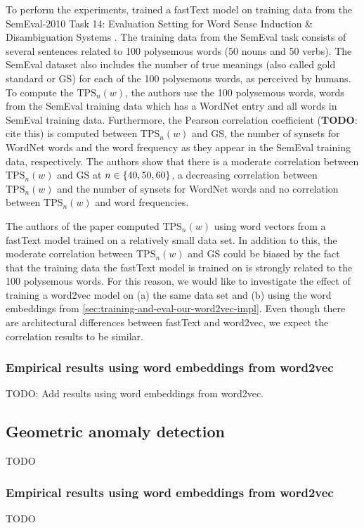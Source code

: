 To perform the experiments, \cite{jakubowski2020topology} trained a fastText model \cite{bojanowski2017enriching} on training data from the SemEval-2010 Task 14: Evaluation Setting for Word Sense Induction \& Disambiguation Systems \cite{manandhar-klapaftis-2009-semeval}. The training data from the SemEval task consists of several sentences related to 100 polysemous words (50 nouns and 50 verbs). The SemEval dataset also includes the number of true meanings (also called gold standard or GS) for each of the 100 polysemous words, as perceived by humans. To compute the $\text{TPS}_n(w)$, the authors use the 100 polysemous words, words from the SemEval training data which has a WordNet \cite{fellbaum1998} entry and all words in SemEval training data. Furthermore, the Pearson correlation coefficient (\textbf{TODO}: cite this) is computed between $\text{TPS}_n(w)$ and GS, the number of synsets for WordNet words and the word frequency as they appear in the SemEval training data, respectively. The authors show that there is a moderate correlation between $\text{TPS}_n(w)$ and GS at $n \in \left\{40, 50, 60\right\}$, a decreasing correlation between $\text{TPS}_n(w)$ and the number of synsets for WordNet words and no correlation between $\text{TPS}_n(w)$ and word frequencies.

The authors of the paper computed $\text{TPS}_n(w)$ using word vectors from a fastText model trained on a relatively small data set. In addition to this, the moderate correlation between $\text{TPS}_n(w)$ and GS could be biased by the fact that the training data the fastText model is trained on is strongly related to the  100 polysemous words. For this reason, we would like to investigate the effect of training a word2vec model on (a) the same data set and (b) using the word embeddings from \cref{sec:training-and-eval-our-word2vec-impl}. Even though there are architectural differences between fastText and word2vec, we expect the correlation results to be similar.

\subsubsection{Empirical results using word embeddings from word2vec}
TODO: Add results using word embeddings from word2vec.

\subsection{Geometric anomaly detection}
TODO

\subsubsection{Empirical results using word embeddings from word2vec}
TODO